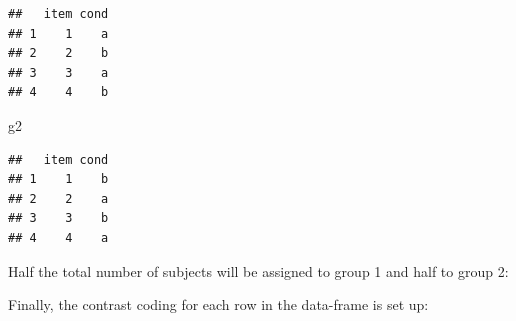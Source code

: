 \documentclass[
  12pt,
]{krantz}
\newenvironment{Shaded}{\begin{snugshade}}{\end{snugshade}}
\newcommand{\AttributeTok}[1]{\textcolor[rgb]{0.77,0.63,0.00}{#1}}
\newcommand{\DecValTok}[1]{\textcolor[rgb]{0.00,0.00,0.81}{#1}}
\newcommand{\DocumentationTok}[1]{\textcolor[rgb]{0.56,0.35,0.01}{\textbf{\textit{#1}}}}
\newcommand{\FunctionTok}[1]{\textcolor[rgb]{0.00,0.00,0.00}{#1}}
\newcommand{\NormalTok}[1]{#1}
\newcommand{\OtherTok}[1]{\textcolor[rgb]{0.56,0.35,0.01}{#1}}
\newcommand{\SpecialCharTok}[1]{\textcolor[rgb]{0.00,0.00,0.00}{#1}}
\newcommand{\StringTok}[1]{\textcolor[rgb]{0.31,0.60,0.02}{#1}}
\theoremstyle{definition}
\theoremstyle{definition}
\theoremstyle{definition}
\theoremstyle{definition}
\theoremstyle{remark}
\begin{document}
\begin{verbatim}
##   item cond
## 1    1    a
## 2    2    b
## 3    3    a
## 4    4    b
\end{verbatim}

\begin{Shaded}
\begin{Highlighting}[]
\NormalTok{g2}
\end{Highlighting}
\end{Shaded}

\begin{verbatim}
##   item cond
## 1    1    b
## 2    2    a
## 3    3    b
## 4    4    a
\end{verbatim}

Half the total number of subjects will be assigned to group 1 and half to group 2:

\begin{Shaded}
\end{Shaded}

Finally, the contrast coding for each row in the data-frame is set up:

\begin{Shaded}
\end{Shaded}
\end{document}
